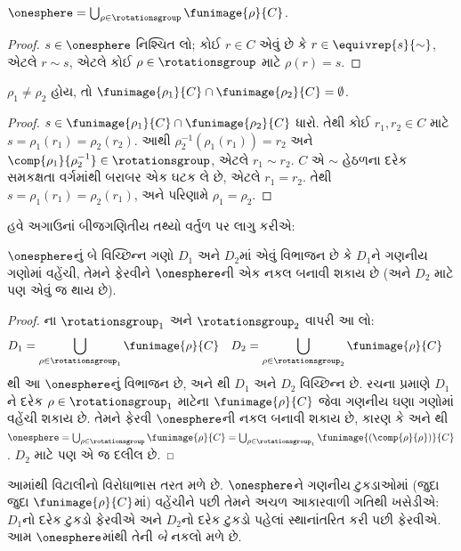 \documentclass[../../../include/open-logic-section]{subfiles}
\begin{document}
\begin{lem}
$\onesphere = \bigcup_{\rho \in \rotationsgroup} \funimage{\rho}{C}$.
\end{lem}

\begin{proof}
$s \in \onesphere$ નિશ્ચિત લો;
કોઈ $r \in C$ એવું છે કે
$r \in \equivrep{s}{\sim}$,
એટલે $r \sim s$, એટલે કોઈ
$\rho \in \rotationsgroup$ માટે
$\rho(r) = s$.
\end{proof}

\begin{lem}
$\rho_1 \neq \rho_2$ હોય, તો
$\funimage{\rho_1}{C} \cap \funimage{\rho_2}{C} = \emptyset$.
\end{lem}

\begin{proof}
$s \in \funimage{\rho_{1}}{C} \cap
\funimage{\rho_{2}}{C}$ ધારો.
તેથી કોઈ $r_{1}, r_{2} \in C$ માટે
$s = \rho_{1}(r_{1}) = \rho_{2}(r_{2})$.
આથી $\rho^{-1}_2(\rho_1(r_1)) = r_2$
અને $\comp{\rho_1}{\rho^{-1}_2} \in
\rotationsgroup$, એટલે $r_{1} \sim
r_{2}$. $C$ એ $\sim$ હેઠળના
દરેક સમકક્ષતા વર્ગમાંથી
બરાબર એક ઘટક લે છે, એટલે
$r_1 = r_2$. તેથી
$s = \rho_1(r_1) = \rho_2(r_1)$,
અને પરિણામે $\rho_1 = \rho_2$.
\end{proof}

હવે અગાઉનાં બીજગણિતીય તથ્યો
વર્તુળ પર લાગુ કરીએ:

\begin{lem}
$\onesphere$નું બે વિચ્છિન્ન ગણો
$D_{1}$ અને $D_{2}$માં એવું
વિભાજન છે કે $D_{1}$ને ગણનીય
ગણોમાં વહેંચી, તેમને ફેરવીને
$\onesphere$ની એક નકલ બનાવી
શકાય છે (અને $D_{2}$ માટે પણ
એવું જ થાય છે).
\end{lem}

\begin{proof}
ના
$\rotationsgroup_{1}$ અને
$\rotationsgroup_{2}$ વાપરી આ લો:
\begin{align*}
	D_{1} &= \bigcup_{\rho \in \rotationsgroup_1} \funimage{\rho}{C} & 
	D_{2} &= \bigcup_{\rho \in \rotationsgroup_2} \funimage{\rho}{C}
\end{align*}
થી આ
$\onesphere$નું વિભાજન છે, અને
થી
$D_1$ અને $D_2$ વિચ્છિન્ન છે.
રચના પ્રમાણે $D_1$ને દરેક
$\rho \in \rotationsgroup_1$ માટેના
$\funimage{\rho}{C}$ જેવા ગણનીય
ઘણા ગણોમાં વહેંચી શકાય છે.
તેમને ફેરવી $\onesphere$ની
નકલ બનાવી શકાય છે, કારણ કે
 અને
થી
$\onesphere = \bigcup_{\rho \in
\rotationsgroup}\funimage{\rho}{C} =
\bigcup_{\rho \in
\rotationsgroup_1}\funimage{(\comp{\rho}{\rho})}{C}$.
$D_2$ માટે પણ એ જ દલીલ છે.
\end{proof}\noindent
આમાંથી વિટાલીનો વિરોધાભાસ
તરત મળે છે. $\onesphere$ને
ગણનીય ટુકડાઓમાં (જુદા જુદા
$\funimage{\rho}{C}$માં) વહેંચીને
પછી તેમને અચળ આકારવાળી ગતિથી
ખસેડીએ: $D_1$નો દરેક ટુકડો
ફેરવીએ અને $D_2$નો દરેક ટુકડો
પહેલાં સ્થાનાંતરિત કરી પછી
ફેરવીએ. આમ $\onesphere$માંથી
તેની \emph{બે} નકલો મળે છે.
\end{document}
